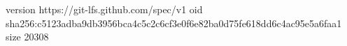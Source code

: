 version https://git-lfs.github.com/spec/v1
oid sha256:c5123adba9db3956bca4c5c2c6cf3e0f6e82ba0d75fe618dd6c4ac95e5a6faa1
size 20308
